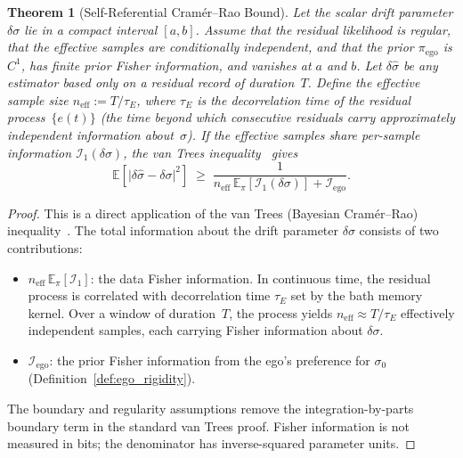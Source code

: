 \documentclass[12pt]{article}
\newtheorem{theorem}{Theorem}
\begin{document}
\begin{theorem}[Self-Referential Cram\'{e}r--Rao Bound]
\label{thm:SRCR}
Let the scalar drift parameter $\delta\sigma$ lie in a compact interval
$[a,b]$.  Assume that the residual likelihood is regular, that the
effective samples are conditionally independent, and that the prior
$\pi_{\mathrm{ego}}$ is $C^1$, has finite prior Fisher information,
and vanishes at $a$ and $b$.  Let $\delta\hat\sigma$ be any estimator
based only on a residual record of duration~$T$.
Define the \emph{effective sample size}
$n_{\mathrm{eff}} := T/\tau_E$, where $\tau_E$ is the
decorrelation time of the residual process~$\{e(t)\}$
(the time beyond which consecutive residuals carry
approximately independent information about~$\sigma$).
If the effective samples share per-sample information
$\mathcal I_1(\delta\sigma)$, the van Trees
inequality~\cite{vanTrees1968} gives
\begin{equation}
\label{eq:SRCR}
\mathbb{E}\!\left[
  \bigl|\delta\hat{\sigma} - \delta\sigma\bigr|^2
\right]
\;\geq\; \frac{1}{
  n_{\mathrm{eff}}\,\mathbb E_{\pi}[\mathcal I_1(\delta\sigma)]
  + \mathcal{I}_{\mathrm{ego}}}.
\end{equation}
\end{theorem}

\begin{proof}
This is a direct application of the van Trees
(Bayesian Cram\'{e}r--Rao)
inequality~\cite{vanTrees1968}.
The total information about the drift parameter $\delta\sigma$
consists of two contributions:
\begin{itemize}
\item $n_{\mathrm{eff}}\,\mathbb E_\pi[\mathcal I_1]$: the data
  Fisher information.  In continuous time, the residual
  process is correlated with decorrelation time $\tau_E$
  set by the bath memory kernel.
  Over a window of duration~$T$, the process yields
  $n_{\mathrm{eff}} \approx T/\tau_E$ effectively
  independent samples, each carrying Fisher information
  about $\delta\sigma$.
\item $\mathcal{I}_{\mathrm{ego}}$: the prior Fisher
  information from the ego's preference for $\sigma_0$
  (Definition~\ref{def:ego_rigidity}).
\end{itemize}
The boundary and regularity assumptions remove the
integration-by-parts boundary term in the standard van Trees proof.
Fisher information is not measured in bits; the denominator has
inverse-squared parameter units.
\end{proof}
\end{document}
